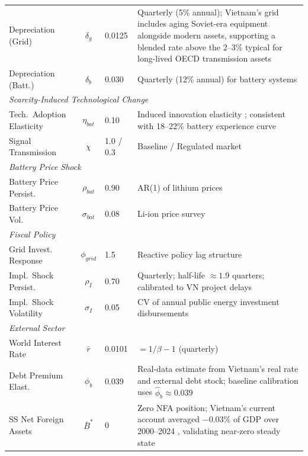 \documentclass[12pt, a4paper]{article}
\begin{document}
\begin{table}[H]
\begin{tabular}{l c l p{6.5cm}}
			Depreciation (Grid) & $\delta_g$ & 0.0125 & Quarterly (5\% annual); Vietnam's grid includes aging Soviet-era equipment alongside modern assets, supporting a blended rate above the 2--3\% typical for long-lived OECD transmission assets \citep{worldbank2022} \\
			Depreciation (Batt.) & $\delta_b$ & 0.030 & Quarterly (12\% annual) for battery systems \\
			\midrule
			\multicolumn{4}{l}{\textit{Scarcity-Induced Technological Change}} \\
			Tech.\ Adoption Elasticity & $\eta_{bat}$ & 0.10 & Induced innovation elasticity \citep{popp2002}; consistent with 18--22\% battery experience curve \citep{kittner2017,way2022} \\
			Signal Transmission & $\chi$ & 1.0 / 0.3 & Baseline / Regulated market \\
			\midrule
			\multicolumn{4}{l}{\textit{Battery Price Shock}} \\
			Battery Price Persist. & $\rho_{bat}$ & 0.90 & AR(1) of lithium prices \citep{bloombergnef2023} \\
			Battery Price Vol. & $\sigma_{bat}$ & 0.08 & \citep{bloombergnef2023} Li-ion price survey \\
			\midrule
			\multicolumn{4}{l}{\textit{Fiscal Policy}} \\
			Grid Invest. Response & $\phi_{grid}$ & 1.5 & Reactive policy lag structure \citep{worldbank2022} \\
			Impl.\ Shock Persist. & $\rho_I$ & 0.70 & Quarterly; half-life $\approx 1.9$ quarters; calibrated to \citep{worldbank2022} VN project delays \\
			Impl.\ Shock Volatility & $\sigma_I$ & 0.05 & CV of annual public energy investment disbursements \citep{mof2023} \\
			\midrule
			\multicolumn{4}{l}{\textit{External Sector}} \\
			World Interest Rate & $\bar{r}$ & 0.0101 & $= 1/\beta - 1$ (quarterly) \\
			Debt Premium Elast. & $\phi_b$ & 0.039 & Real-data estimate from Vietnam's real rate and external debt stock; baseline calibration uses $\hat{\phi}_b \approx 0.039$ \\
			SS Net Foreign Assets & $\bar{B}^*$ & 0 & Zero NFA position; Vietnam's current account averaged $-0.03\%$ of GDP over 2000--2024 \citep{worldbank2024}, validating near-zero steady state \\
			\bottomrule
		\end{tabular}

\end{table}
\end{document}
